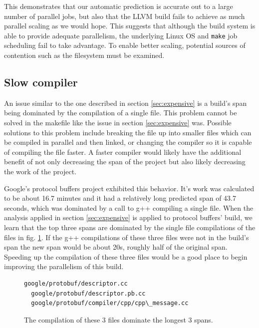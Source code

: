 \documentclass[sigconf,10pt,authorversion]{acmart}\settopmatter{printfolios=true,printccs=false,printacmref=false}
\begin{document}
This demonstrates that our automatic prediction is accurate out to a
large number of parallel jobs, but also that the LLVM build fails to
achieve as much parallel scaling as we would hope. This suggests that
although the build system is able to provide adequate parallelism, the
underlying Linux OS and \verb|make| job scheduling fail to take
advantage. To enable better scaling, potential sources of contention
such as the filesystem must be examined.




\subsection{Slow compiler}
\label{sec:compiler}

An issue similar to the one described in section \ref{sec:expensive} is a build's
span being dominated by the compilation of a single file.  This problem cannot be
solved in the makefile like the issue in section \ref{sec:expensive} was.
Possible solutions to this problem include
breaking the file up into smaller files which can be compiled in parallel and then
linked, or changing the compiler so it is capable of compiling the file faster.
A faster compiler would likely have the additional benefit of not only decreasing the span
of the project but also likely decreasing the work of the project.

Google's protocol buffers project \cite{protobufs3.6.1} exhibited this behavior.  It's work was calculated
to be about 16.7 minutes and it had a relatively
long predicted span of 43.7 seconds, which was dominated by a call to g++ compiling
a single file.  When the analysis applied in section \ref{sec:expensive} is applied
to protocol buffers' build, we learn that the top three spans are dominated by the
single file compilations of the files in fig. \ref{code:g++1}.  If the g++ compilations
of these three files were not in the build's span the new span would be about 20s,
roughly half of the original span.  Speeding up the compilation of these three files
would be a good place to begin improving the parallelism of this build.

\begin{figure}[H]
\begin{Verbatim}[commandchars=\\\{\},codes={\catcode`$=3\catcode`^=7\catcode`_=8},fontsize=\small]
  google/protobuf/descriptor.cc
  google/protobuf/descriptor.pb.cc
  google/protobuf/compiler/cpp/cpp\_message.cc
\end{Verbatim}
\caption{The compilation of these 3 files dominate the longest 3 spans.}
\label{code:g++1}
\end{figure}
\end{document}
